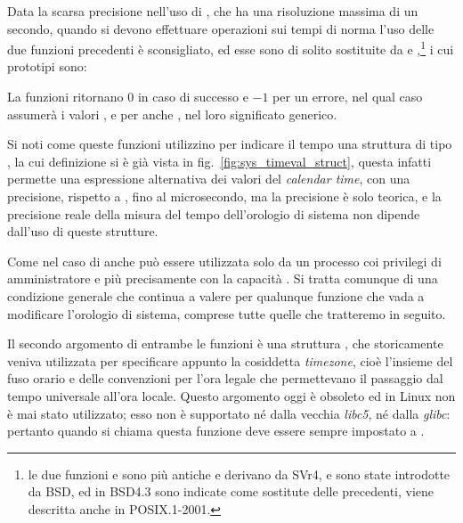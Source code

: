 Data la scarsa precisione nell'uso di , che ha una risoluzione
massima di un secondo, quando si devono effettuare operazioni sui tempi di
norma l'uso delle due funzioni precedenti è sconsigliato, ed esse sono di
solito sostituite da  e ,\footnote{le
  due funzioni  e  sono più antiche e derivano da SVr4,
   e  sono state introdotte da BSD, ed
  in BSD4.3 sono indicate come sostitute delle precedenti, 
  viene descritta anche in POSIX.1-2001.} i cui prototipi sono:

\begin{funcproto}{
}

{La funzioni ritornano $0$ in caso di successo e $-1$ per un errore, nel qual
  caso  assumerà i valori ,  e per
   anche , nel loro significato generico.}
\end{funcproto}


Si noti come queste funzioni utilizzino per indicare il tempo una struttura di
tipo , la cui definizione si è già vista in
fig.~\ref{fig:sys_timeval_struct}, questa infatti permette una espressione
alternativa dei valori del \textit{calendar time}, con una precisione,
rispetto a , fino al microsecondo, ma la precisione è solo
teorica, e la precisione reale della misura del tempo dell'orologio di sistema
non dipende dall'uso di queste strutture.

Come nel caso di  anche  può essere utilizzata
solo da un processo coi privilegi di amministratore e più precisamente con la
capacità . Si tratta comunque di una condizione generale
che continua a valere per qualunque funzione che vada a modificare l'orologio
di sistema, comprese tutte quelle che tratteremo in seguito.


Il secondo argomento di entrambe le funzioni è una struttura
, che storicamente veniva utilizzata per specificare appunto
la cosiddetta \textit{timezone}, cioè l'insieme del fuso orario e delle
convenzioni per l'ora legale che permettevano il passaggio dal tempo
universale all'ora locale. Questo argomento oggi è obsoleto ed in Linux non è
mai stato utilizzato; esso non è supportato né dalla vecchia \textsl{libc5},
né dalla \textsl{glibc}: pertanto quando si chiama questa funzione deve essere
sempre impostato a .

